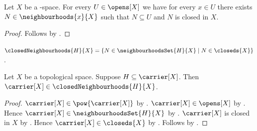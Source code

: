 \begin{corollary}\label{teethree_implies_closed_neighbourhood_in_open}
    Let $X$ be a \teethree-space.
    For every $U\in\opens[X]$ we have for every $x\in U$ there exists
        $N\in\neighbourhoods{x}{X}$ such that
        $N\subseteq U$ and $N$ is closed in $X$.
\end{corollary}
\begin{proof}
    Follows by .
\end{proof}

\begin{definition}\label{closed_neighbourhoods}
    $\closedNeighbourhoods{H}{X}
        =\{N\in\neighbourhoodsSet{H}{X}\mid N\in\closeds{X}\}$.
\end{definition}

\begin{proposition}\label{carrier_is_closed_neighbourhood}
    Let $X$ be a topological space.
    Suppose $H\subseteq\carrier[X]$.
    Then $\carrier[X]\in\closedNeighbourhoods{H}{X}$.
\end{proposition}
\begin{proof}
    $\carrier[X]\in\pow{\carrier[X]}$ by .
    $\carrier[X]\in\opens[X]$ by .
    Hence $\carrier[X]\in\neighbourhoodsSet{H}{X}$
        by .
    $\carrier[X]$ is closed in $X$ by .
    Hence $\carrier[X]\in\closeds{X}$ by .
    Follows by .
\end{proof}

